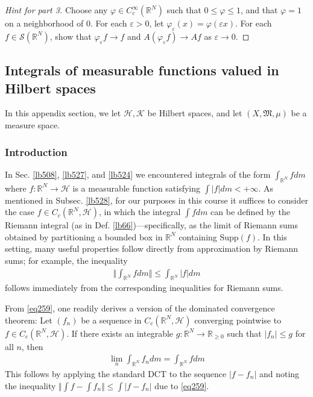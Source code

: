 \documentclass[12pt,b5paper,notitlepage]{article}
\theoremstyle{definition}
\theoremstyle{plain}
\newcommand{\fk}{\mathfrak}
\newcommand{\Rbb}{\mathbb R}
\newcommand{\Supp}{\mathrm{Supp}}
\newcommand{\eps}{\varepsilon}
\newcommand{\MH}{\mathcal H}
\newcommand{\MK}{\mathcal K}
\newcommand{\MS}{\mathcal S}
\numberwithin{equation}{section}
\begin{document}
\begin{proof}[Hint for part 3]
Choose any $\varphi\in C_c^\infty(\Rbb^N)$ such that $0\leq\varphi\leq 1$, and that $\varphi=1$ on a neighborhood of $0$. For each $\eps>0$, let $\varphi_\eps(x)=\varphi(\eps x)$. For each $f\in\MS(\Rbb^N)$, show that $\varphi_\eps f\rightarrow f$ and $A(\varphi_\eps f)\rightarrow Af$ as $\eps\rightarrow0$.
\end{proof}






\begin{subappendices}



\subsection{Integrals of measurable functions valued in Hilbert spaces}\label{lb498}



In this appendix section, we let $\MH,\MK$ be Hilbert spaces, and let $(X,\fk M,\mu)$ be a measure space.


\subsubsection{Introduction}

In Sec. \ref{lb508}, \ref{lb527}, and \ref{lb524} we encountered integrals of the form $\int_{\Rbb^N}fdm$ where $f:\Rbb^N\rightarrow\MH$ is a measurable function satisfying $\int |f|dm<+\infty$. As mentioned in Subsec. \ref{lb528}, for our purposes in this course it suffices to consider the case $f\in C_c(\Rbb^N,\MH)$, in which the integral $\int fdm$ can be defined by the Riemann integral (as in Def. \ref{lb66})---specifically, as the limit of Riemann sums obtained by partitioning a bounded box in $\mathbb{R}^N$ containing $\Supp(f)$. In this setting, many useful properties follow directly from approximation by Riemann sums; for example, the inequality
\begin{align}\label{eq259}
\Big\Vert\int_{\Rbb^N}fdm\Big\Vert\leq \int_{\Rbb^N}|f|dm
\end{align}
follows immediately from the corresponding inequalities for Riemann sums.

From \eqref{eq259}, one readily derives a version of the dominated convergence theorem: Let $(f_n)$ be a sequence in $C_c(\Rbb^N,\MH)$ converging pointwise to $f\in C_c(\Rbb^N,\MH)$. If there exists an integrable $g:\Rbb^N\rightarrow\Rbb_{\geq0}$ such that $|f_n|\leq g$ for all $n$, then
\begin{align*}
\lim_n\int_{\Rbb^N}f_ndm=\int_{\Rbb^N}fdm
\end{align*}
This follows by applying the standard DCT to the sequence $|f- f_n|$ and noting the inequality $\Vert \int f - \int f_n \Vert \leq \int |f - f_n|$ due to \eqref{eq259}.



\end{subappendices}
\end{document}
